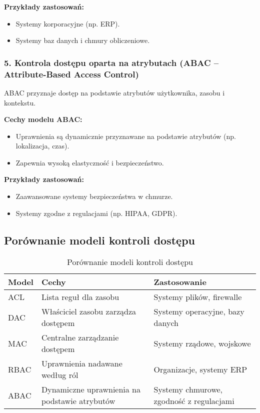 \textbf{Przykłady zastosowań:}
\begin{itemize}
    \item Systemy korporacyjne (np. ERP).
    \item Systemy baz danych i chmury obliczeniowe.
\end{itemize}

\subsubsection{5. Kontrola dostępu oparta na atrybutach (ABAC – Attribute-Based Access Control)}
ABAC przyznaje dostęp na podstawie atrybutów użytkownika, zasobu i kontekstu.

\textbf{Cechy modelu ABAC:}
\begin{itemize}
    \item Uprawnienia są dynamicznie przyznawane na podstawie atrybutów (np. lokalizacja, czas).
    \item Zapewnia wysoką elastyczność i bezpieczeństwo.
\end{itemize}

\textbf{Przykłady zastosowań:}
\begin{itemize}
    \item Zaawansowane systemy bezpieczeństwa w chmurze.
    \item Systemy zgodne z regulacjami (np. HIPAA, GDPR).
\end{itemize}

\subsection{Porównanie modeli kontroli dostępu}

\begin{table}[h]
    \centering
    \renewcommand{\arraystretch}{1.3} %
    \begin{tabularx}{\textwidth}{|l|X|X|}
        \hline
        \textbf{Model} & \textbf{Cechy} & \textbf{Zastosowanie} \\
        \hline
        ACL  & Lista reguł dla zasobu  & Systemy plików, firewalle \\
        \hline
        DAC  & Właściciel zasobu zarządza dostępem  & Systemy operacyjne, bazy danych \\
        \hline
        MAC  & Centralne zarządzanie dostępem  & Systemy rządowe, wojskowe \\
        \hline
        RBAC & Uprawnienia nadawane według ról  & Organizacje, systemy ERP \\
        \hline
        ABAC & Dynamiczne uprawnienia na podstawie atrybutów  & Systemy chmurowe, zgodność z regulacjami \\
        \hline
    \end{tabularx}
    \caption{Porównanie modeli kontroli dostępu}
\end{table}


